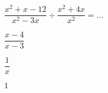 \begin{QCM}
\begin{GroupeQCM}
      \begin{exercice}
      $\dfrac{x^2+x-12}{x^2-3x}\div \dfrac{x^2+4x}{x^2}=...$
      \begin{ChoixQCM}{3}
      \item $\dfrac{x-4}{x-3}$
      \item $\dfrac{1}{x}$
      \item $1$
      \end{ChoixQCM}
      \begin{corrige}
   \end{corrige}
    \end{exercice}
 \end{GroupeQCM}  
\end{QCM}  
    

    
   

  
